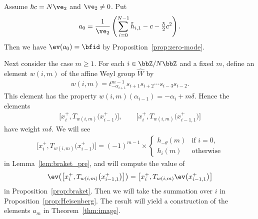 Assume $\hbar c = N \ve_2$ and $\ve_2 \neq 0$. Put
\begin{gather*}
a_0 = \dfrac{1}{\ve_2} \left( \sum_{i=0}^{N-1} \tilde{h}_{i,1} - c - \tfrac{\hbar}{2} c^2\right).
\end{gather*}
Then we have $\ev(a_0) = \bfid$ by Proposition~\ref{prop:zero-mode}.

Next consider the case $m \geq 1$. For each $i \in \bbZ/N\bbZ$ and a fixed $m$, define an element $w(i,m)$ of the affine Weyl group $\hat{W}$ by
\begin{gather*}
w(i,m) = t_{-\alpha_{i+1}}^{m-1} s_{i+1} s_{i+2} \cdots s_{i-3} s_{i-2}.
\end{gather*}
This element has the property $w(i,m)(\alpha_{i-1}) = -\alpha_{i} + m \delta$. Hence the elements
\begin{gather*}
\big[x_{i}^{+}, T_{w(i,m)}\big(x_{i-1}^{+}\big)\big],\qquad \big[x_{i}^{+}, T_{w(i,m)}\big(x_{i-1,1}^{+}\big)\big]
\end{gather*} have weight $m\delta$.
We will see
\begin{gather*}
\big[x_{i}^+, T_{w(i,m)}\big(x_{i-1}^+\big)\big] = (-1)^{m-1} \times \begin{cases}
h_{-\theta}(m) & \text{if $i=0$},\\
h_i(m) & \text{otherwise}
\end{cases}
\end{gather*}
in Lemma~\ref{lem:braket_pre}, and will compute the value of
\begin{gather*}
\ev \big( \big[x_{i}^{+}, T_{w(i,m)}\big(x_{i-1,1}^{+}\big)\big]\big) = \big[x_{i}^{+}, T_{w(i,m)}\ev\big(x_{i-1,1}^{+}\big)\big]
\end{gather*}
in Proposition~\ref{prop:braket}. Then we will take the summation over $i$ in Proposition~\ref{prop:Heisenberg}. The result will yield a construction of the elements $a_m$ in Theorem~\ref{thm:image}.

